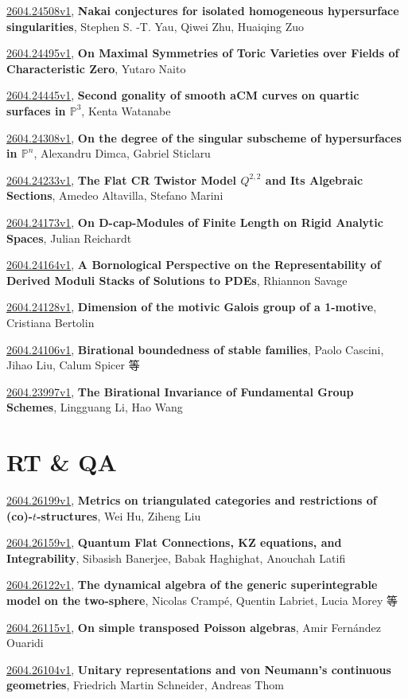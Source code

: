 \documentclass[9pt, a4paper]{article}
\theoremstyle{plain}
\theoremstyle{definition}
\theoremstyle{remark}
\newcommand{\arxiv}[3]{\href{https://arxiv.org/abs/#1}{#1}, \textbf{\textcolor{arxivblue}{#2}}, #3}
\begin{document}
\arxiv{2604.24508v1}{Nakai conjectures for isolated homogeneous hypersurface singularities}{Stephen S. -T. Yau, Qiwei Zhu, Huaiqing Zuo}

\arxiv{2604.24495v1}{On Maximal Symmetries of Toric Varieties over Fields of Characteristic Zero}{Yutaro Naito}

\arxiv{2604.24445v1}{Second gonality of smooth aCM curves on quartic surfaces in $\mathbb{P}^3$}{Kenta Watanabe}

\arxiv{2604.24308v1}{On the degree of the singular subscheme of hypersurfaces in ${\mathbb P}^n$}{Alexandru Dimca, Gabriel Sticlaru}

\arxiv{2604.24233v1}{The Flat CR Twistor Model $Q^{2,2}$ and Its Algebraic Sections}{Amedeo Altavilla, Stefano Marini}

\arxiv{2604.24173v1}{On D-cap-Modules of Finite Length on Rigid Analytic Spaces}{Julian Reichardt}

\arxiv{2604.24164v1}{A Bornological Perspective on the Representability of Derived Moduli Stacks of Solutions to PDEs}{Rhiannon Savage}

\arxiv{2604.24128v1}{Dimension of the motivic Galois group of a 1-motive}{Cristiana Bertolin}

\arxiv{2604.24106v1}{Birational boundedness of stable families}{Paolo Cascini, Jihao Liu, Calum Spicer 等}

\arxiv{2604.23997v1}{The Birational Invariance of Fundamental Group Schemes}{Lingguang Li, Hao Wang}


\section{RT \& QA}
\arxiv{2604.26199v1}{Metrics on triangulated categories and restrictions of (co)-$t$-structures}{Wei Hu, Ziheng Liu}

\arxiv{2604.26159v1}{Quantum Flat Connections, KZ equations, and Integrability}{Sibasish Banerjee, Babak Haghighat, Anouchah Latifi}

\arxiv{2604.26122v1}{The dynamical algebra of the generic superintegrable model on the two-sphere}{Nicolas Crampé, Quentin Labriet, Lucia Morey 等}

\arxiv{2604.26115v1}{On simple transposed Poisson algebras}{Amir Fernández Ouaridi}

\arxiv{2604.26104v1}{Unitary representations and von Neumann's continuous geometries}{Friedrich Martin Schneider, Andreas Thom}
\end{document}
